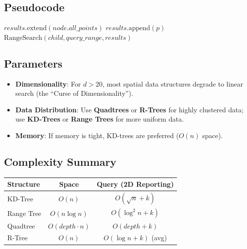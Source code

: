 \subsection{Pseudocode}

\begin{algorithm}[htbp]
\caption{Orthogonal Range Search (Tree-based)}
\label{alg:range_search}
\begin{algorithmic}[1]
    \State \Return
  \EndIf
    \State \Return
  \EndIf
    \State $results.\text{extend}(node.all\_points)$
    \State \Return
  \EndIf
        \State $results.\text{append}(p)$
      \EndIf
    \EndFor
  \Else
      \State $\text{RangeSearch}(child, query\_range, results)$
    \EndFor
  \EndIf
\EndFunction
\end{algorithmic}
\end{algorithm}

\subsection{Parameters}

\begin{itemize}
\item \textbf{Dimensionality}: For $d > 20$, most spatial data structures degrade to linear search (the ``Curse of Dimensionality'').
\item \textbf{Data Distribution}: Use \textbf{Quadtrees} or \textbf{R-Trees} for highly clustered data; use \textbf{KD-Trees} or \textbf{Range Trees} for more uniform data.
\item \textbf{Memory}: If memory is tight, KD-trees are preferred ($O(n)$ space).
\end{itemize}

\subsection{Complexity Summary}

\begin{center}
\begin{tabular}{|l|c|c|}
\hline
\textbf{Structure} & \textbf{Space} & \textbf{Query (2D Reporting)} \\
\hline
KD-Tree & $O(n)$ & $O(\sqrt{n} + k)$ \\
Range Tree & $O(n \log n)$ & $O(\log^2 n + k)$ \\
Quadtree & $O(depth \cdot n)$ & $O(depth + k)$ \\
R-Tree & $O(n)$ & $O(\log n + k)$ (avg) \\
\hline
\end{tabular}
\end{center}

